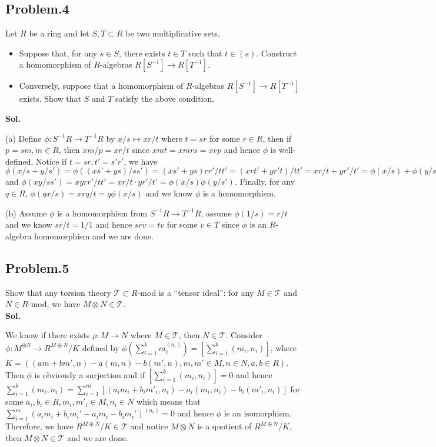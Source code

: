 \documentclass[lang=en,11pt,a4paper,citestyle =authoryear]{elegantpaper}
\begin{document}
\subsection*{Problem.4} 
Let $R$ be a ring and let $S, T \subset R$ be two multiplicative sets.\par
\begin{itemize}
    \item Suppose that, for any $s \in S$, there exists $t \in T$ such that $t \in (s)$. Construct a homomorphism of $R$-algebras $R[S^{-1}] \to R[T^{-1}]$.

    \item Conversely, suppose that a homomorphism of $R$-algebras $R[S^{-1}] \to
R[T^{-1}]$ exists. Show that $S$ and $T$ satisfy the above condition.
\end{itemize}
\vspace{0.5em}
\textbf{Sol.} \par
(a) Define $\phi:S^{-1}R \to T^{-1}R$ by $x/s \mapsto xr/t$ where $t = sr$ for some $r\in R$, then if $p = sm, m\in R$, then $xm/p = xr/t$ since $xmt = xmrs = xrp$ and hence $\phi$ is well-defined. Notice if $t = sr, t' = s'r'$, we have $\phi(x/s + y/s') = \phi((xs’+ys)/ss') = (xs'+ys)rr'/tt' = (xrt' + yr't)/tt' = xr/t + yr'/t' = \phi(x/s)+\phi(y/s') $ and $\phi(xy/ss') = xyrr'/tt' = xr/t\cdot yr'/t' = \phi(x/s)\phi(y/s')$. Finally, for any $q\in R$, $\phi(qx/s) = xrq/t = q\phi(x/s)$ and we know $\phi$ is a homomorphism.\par
(b) Assume $\phi$ is a homomorphism from $S^{-1}R \to T^{-1}R$, assume $\phi(1/s) = r/t$ and we know $sr/t = 1/1$ and hence $srv = tv$ for some $v \in T$ since $\phi$ is an $R$-algebra homomorphism and we are done.
\par 
\vspace{0.5em}

\subsection*{Problem.5} 
Show that any torsion theory $\mathcal{T} \subset R$-mod is a “tensor ideal”: for any $M \in \mathcal{T}$ and $N \in R$-mod, we have $M \otimes N \in \mathcal{T} $.
\vspace{0.5em}\\
\textbf{Sol.} \par
We know if there exists $\rho: M \to N$ where $M\in\mathcal{T}$, then $N\in \mathcal{T}$. Consider $\phi: M^{\oplus N} \to R^{M \oplus N}/K$ defined by $\phi\left(\sum\limits_{i=1}^k m_i^{(n_i)}\right) = \left[\sum\limits_{i=1}^k (m_i,n_i)\right]$, where $K = ((am+bm',n) - a(m,n)-b(m',n), m,m'\in M,n \in N,a,b\in R)$. Then $\phi$ is obviously a surjection and if $\left[\sum\limits_{i=1}^k (m_i,n_i)\right] = 0$ and hence $\sum\limits_{i=1}^k (m_i,n_i) = \sum\limits_{i=1}^m [(a_im_i+b_im'_i,n_i) - a_i(m_i,n_i)-b_i(m'_i,n_i)]$ for some $a_i,b_i\in R,m_i,m'_i\in M, n_i\in N$ which means that $\sum\limits_{i=1}^m (a_im_i+b_im_i' - a_i m_i - b_i m_i')^{(n_i)} = 0$ and hence $\phi$ is an isomorphism. Therefore, we have $R^{M\oplus N}/K \in \mathcal{T}$ and notice $M\otimes N$ is a quotient of $R^{M\oplus N}/ K$, then $M\otimes N \in \mathcal{T}$ and we are done. 
\par 
\vspace{0.5em}
\end{document}
